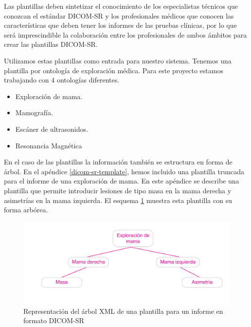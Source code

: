 Las plantillas deben sintetizar el conocimiento de los especialistas técnicos que conozcan el estándar DICOM-SR y los profesionales médicos que conocen las características que deben tener los informes de las pruebas clínicas, por lo que será imprescindible la colaboración entre los profesionales de ambos ámbitos para crear las plantillas DICOM-SR.\medskip\par

Utilizamos estas plantillas como entrada para nuestro sistema. Tenemos una plantilla por ontología de exploración médica. Para este proyecto estamos trabajando con 4 ontologías diferentes.
\begin{itemize}
	\item Exploración de mama.
	\item Mamografía.
	\item Escáner de ultrasonidos.
	\item Resonancia Magnética
\end{itemize}

En el caso de las plantillas la información también se estructura en forma de árbol. En el apéndice \ref{dicom-sr-template}, hemos incluido una plantilla truncada para el informe de una exploración de mama. En este apéndice se describe una plantilla que permite introducir lesiones de tipo masa en la mama derecha y asimetrías en la mama izquierda. El esquema \ref{fig:dicom-template} muestra esta plantilla con su  forma arbórea.\medskip\par

\begin{figure}[ht]
\centering
\includegraphics[scale=0.7]{./imgs/esquemas/dicomTreeTemplate.pdf}
\caption{Representación del árbol XML de una plantilla para un informe en formato DICOM-SR}
\label{fig:dicom-template}
\end{figure}


